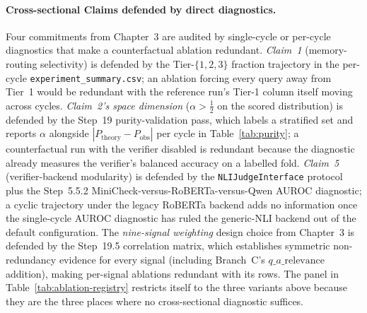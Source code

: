 \paragraph{Cross-sectional Claims defended by direct diagnostics.}
Four commitments from Chapter~3 are audited by single-cycle or per-cycle diagnostics that make a counterfactual ablation redundant. \emph{Claim~1} (memory-routing selectivity) is defended by the Tier-$\{1,2,3\}$ fraction trajectory in the per-cycle \texttt{experiment\_summary.csv}; an ablation forcing every query away from Tier~1 would be redundant with the reference run's Tier-1 column itself moving across cycles. \emph{Claim~2's space dimension} ($\alpha > \tfrac{1}{2}$ on the scored distribution) is defended by the Step~19 purity-validation pass, which labels a stratified set and reports $\alpha$ alongside $|P_{\text{theory}} - P_{\text{obs}}|$ per cycle in Table~\ref{tab:purity}; a counterfactual run with the verifier disabled is redundant because the diagnostic already measures the verifier's balanced accuracy on a labelled fold. \emph{Claim~5} (verifier-backend modularity) is defended by the \texttt{NLIJudgeInterface} protocol plus the Step~5.5.2 MiniCheck-versus-RoBERTa-versus-Qwen AUROC diagnostic; a cyclic trajectory under the legacy RoBERTa backend adds no information once the single-cycle AUROC diagnostic has ruled the generic-NLI backend out of the default configuration. The \emph{nine-signal weighting} design choice from Chapter~3 is defended by the Step~19.5 correlation matrix, which establishes symmetric non-redundancy evidence for every signal (including Branch~C's $q\_a\_\text{relevance}$ addition), making per-signal ablations redundant with its rows. The panel in Table~\ref{tab:ablation-registry} restricts itself to the three variants above because they are the three places where no cross-sectional diagnostic suffices.

